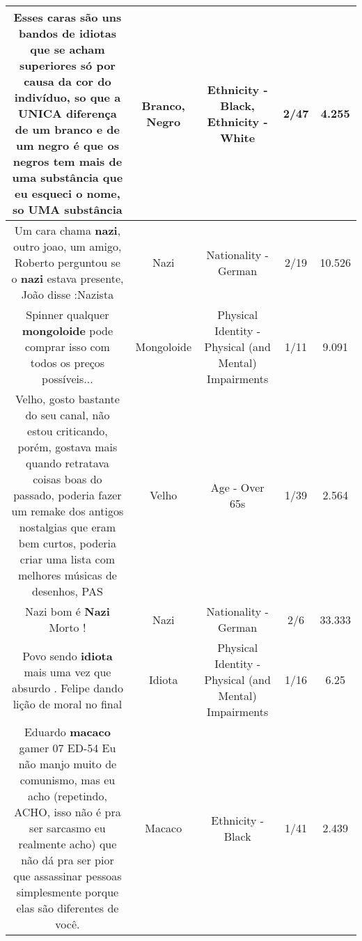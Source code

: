 \documentclass[11pt]{article}
\newlength\mylength
\begin{document}
\begin{center}
\begin{longtable}{|C{.65\mylength}|C{.30\mylength}|C{.12\mylength}|C{.12\mylength}|C{.12\mylength}|}
  \small Esses caras são uns bandos de idiotas que se acham superiores só por causa da cor do indivíduo, so que a UNICA diferença de um \textbf{branco} e de um \textbf{negro} é que os negros tem mais de uma substância que eu esqueci o nome, so UMA substância\normalsize   & Branco, Negro & Ethnicity - Black, Ethnicity - White & 2/47 & 4.255 \\  \hline
  \small Um cara chama \textbf{nazi}, outro joao, um amigo, Roberto perguntou se o \textbf{nazi} estava presente, João disse :Nazista\normalsize   & Nazi & Nationality - German & 2/19 & 10.526 \\  \hline
  \small Spinner qualquer \textbf{mongoloide} pode comprar isso com todos os preços possíveis...\normalsize   & Mongoloide & Physical Identity - Physical (and Mental) Impairments & 1/11 & 9.091 \\  \hline
  \small Velho, gosto bastante do seu canal, não estou criticando, porém, gostava mais quando retratava coisas boas do passado, poderia fazer um remake dos antigos nostalgias que eram bem curtos, poderia criar uma lista com melhores músicas de desenhos, PAS\normalsize   & Velho & Age - Over 65s & 1/39 & 2.564 \\  \hline
  \small Nazi bom é \textbf{Nazi} Morto !\normalsize   & Nazi & Nationality - German & 2/6 & 33.333 \\  \hline
  \small Povo sendo \textbf{idiota} mais uma vez que absurdo . Felipe dando lição de moral no final\normalsize   & Idiota & Physical Identity - Physical (and Mental) Impairments & 1/16 & 6.25 \\  \hline
  \small Eduardo \textbf{macaco} gamer 07 ED-54 Eu não manjo muito de comunismo, mas eu acho (repetindo, ACHO, isso não é pra ser sarcasmo eu realmente acho) que não dá pra ser pior que assassinar pessoas simplesmente porque elas são diferentes de você.\normalsize   & Macaco & Ethnicity - Black & 1/41 & 2.439 \\  \hline

\end{longtable}
\end{center}
\end{document}
